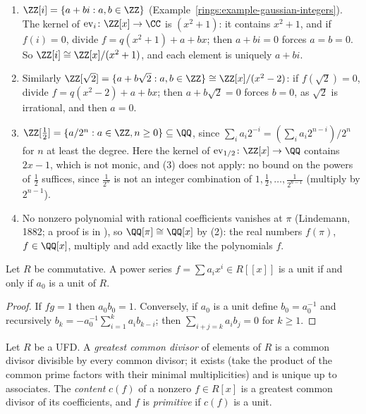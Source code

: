 \begin{example}\label{rings:example-adjoin}
\begin{enumerate}
\item $\ZZ[i] = \{a + bi : a, b \in \ZZ\}$ (Example~\ref{rings:example-gaussian-integers}). The kernel of $\mathrm{ev}_i \colon \ZZ[x] \to \CC$ is $(x^2 + 1)$: it contains $x^2 + 1$, and if $f(i) = 0$, divide $f = q(x^2 + 1) + a + bx$; then
$a + bi = 0$ forces $a = b = 0$. So $\ZZ[i] \cong \ZZ[x]/(x^2 + 1)$, and each element is uniquely $a + bi$.
\item Similarly $\ZZ[\sqrt 2] = \{a + b\sqrt 2 : a, b \in \ZZ\} \cong \ZZ[x]/(x^2 - 2)$: if $f(\sqrt 2) = 0$, divide $f = q(x^2 - 2) + a + bx$; then $a + b\sqrt 2 = 0$ forces $b = 0$, as $\sqrt 2$ is irrational, and then $a = 0$.
\item $\ZZ[\frac12] = \{a/2^n : a \in \ZZ, n \geq 0\} \subseteq \QQ$, since $\sum_ia_i2^{-i} = (\sum_ia_i2^{n-i})/2^n$ for $n$ at least the degree. Here the kernel of $\mathrm{ev}_{1/2} \colon \ZZ[x] \to \QQ$ contains $2x - 1$,
which is not monic, and (3) does not apply: no bound on the powers of $\frac12$ suffices, since $\frac1{2^n}$ is not an integer combination of $1, \frac12, \ldots, \frac1{2^{n-1}}$ (multiply by $2^{n-1}$).
\item No nonzero polynomial with rational coefficients vanishes at $\pi$ (Lindemann, 1882; a proof is in \cite[Appendix 1]{lang-algebra}), so $\QQ[\pi] \cong \QQ[x]$ by (2): the real numbers $f(\pi)$, $f \in \QQ[x]$, multiply
and add exactly like the polynomials $f$.
\end{enumerate}
\end{example}

\begin{proposition}\label{rings:proposition-power-series-units}
Let $R$ be commutative. A power series $f = \sum a_i x^i \in R[[x]]$ is a unit if and only if
$a_0$ is a unit of $R$.
\end{proposition}

\begin{proof}
If $fg = 1$ then $a_0 b_0 = 1$. Conversely, if $a_0$ is a unit define $b_0 = a_0^{-1}$
and recursively $b_k = -a_0^{-1}\sum_{i=1}^k a_i b_{k-i}$; then $\sum_{i+j=k} a_i b_j = 0$ for
$k \geq 1$.
\end{proof}

\begin{definition}\label{rings:definition-content}
Let $R$ be a UFD. A \emph{greatest common divisor} of elements of $R$ is a common
divisor divisible by every common divisor; it exists (take the product of the common
prime factors with their minimal multiplicities) and is unique up to associates. The
\emph{content} $c(f)$ of a nonzero $f \in R[x]$ is a greatest common divisor of its
coefficients, and $f$ is \emph{primitive} if $c(f)$ is a unit.
\end{definition}

